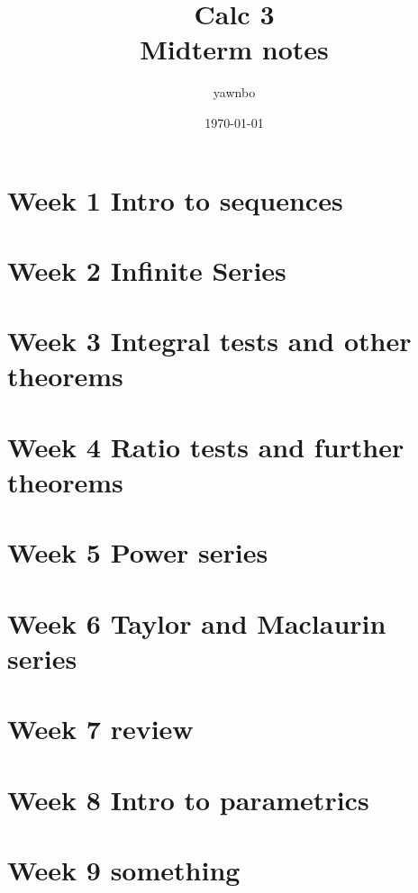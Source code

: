 \documentclass{report}
\title{\Huge{Calc 3}\\ Midterm notes}
\author{\huge{yawnbo}}
\date{\today}
\begin{document}
\maketitle
\tableofcontents
\pagebreak

\chapter{Week 1 Intro to sequences}

\chapter{Week 2 Infinite Series}

\chapter{Week 3 Integral tests and other theorems}

\chapter{Week 4 Ratio tests and further theorems}

\chapter{Week 5 Power series}

\chapter{Week 6 Taylor and Maclaurin series}

\chapter{Week 7 review}

\chapter{Week 8 Intro to parametrics}

\chapter{Week 9 something}

\end{document}
